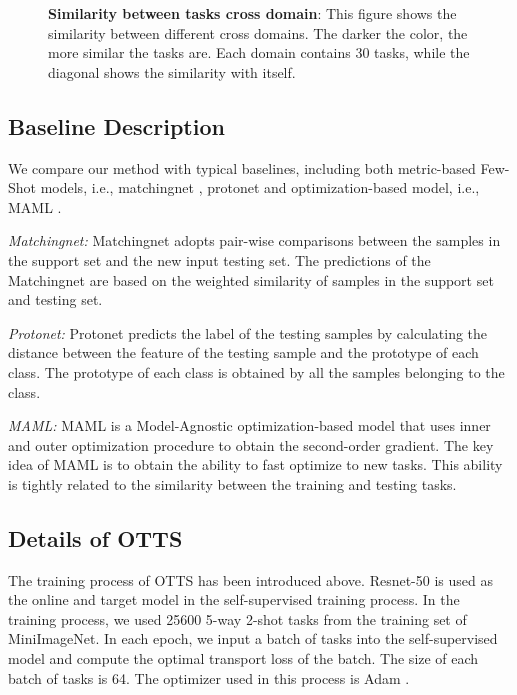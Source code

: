 \documentclass[10pt,journal,compsoc]{IEEEtran}
\begin{document}
\begin{figure*}[!t]
\centering
\subfigbottomskip=1pt %
\subfigcapskip=-5pt %
\caption{\textbf{Similarity between tasks cross domain}: This figure shows the similarity between different cross domains. The darker the color, the more similar the tasks are. Each domain contains 30 tasks, while the diagonal shows the similarity with itself.}
\label{distance_figure}
\end{figure*}

\subsection{Baseline Description}

We compare our method with typical baselines, including both metric-based Few-Shot models, i.e., matchingnet \cite{matchingnet}, protonet \cite{protonet} and optimization-based model, i.e., MAML \cite{MAML}.

\emph{Matchingnet:}
Matchingnet adopts pair-wise comparisons between the samples in the support set and the new input testing set. The predictions of the Matchingnet are based on the weighted similarity of samples in the support set and testing set. 

\emph{Protonet:}
Protonet predicts the label of the testing samples by calculating the distance between the feature of the testing sample and the prototype of each class. The prototype of each class is obtained by all the samples belonging to the class. 

\emph{MAML:}
MAML is a Model-Agnostic optimization-based model that uses inner and outer optimization procedure to obtain the second-order gradient. The key idea of MAML is to obtain the ability to fast optimize to new tasks. This ability is tightly related to the similarity between the training and testing tasks.

\subsection{Details of OTTS}

The training process of OTTS has been introduced above. Resnet-50 \cite{resnet} is used as the online and target model in the self-supervised training process. In the training process, we used 25600 5-way 2-shot tasks from the training set of MiniImageNet. In each epoch, we input a batch of tasks into the self-supervised model and compute the optimal transport loss of the batch. The size of each batch of tasks is 64. The optimizer used in this process is Adam \cite{adam}.
\end{document}
